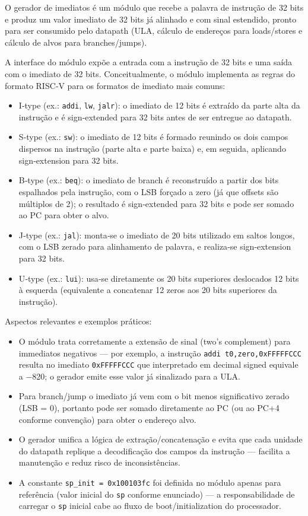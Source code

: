 \documentclass[12pt,a4paper]{article}
\begin{document}
O gerador de imediatos é um módulo que recebe a palavra de instrução de 32 bits e produz um valor imediato de 32 bits já alinhado e com sinal estendido, pronto para ser consumido pelo datapath (ULA, cálculo de endereços para loads/stores e cálculo de alvos para branches/jumps).

A interface do módulo expõe a entrada com a instrução de 32 bits e uma saída com o imediato de 32 bits. Conceitualmente, o módulo implementa as regras do formato RISC‑V para os formatos de imediato mais comuns:

\begin{itemize}
    \item I‑type (ex.: \texttt{addi}, \texttt{lw}, \texttt{jalr}): o imediato de 12 bits é extraído da parte alta da instrução e é sign‑extended para 32 bits antes de ser entregue ao datapath.
    \item S‑type (ex.: \texttt{sw}): o imediato de 12 bits é formado reunindo os dois campos dispersos na instrução (parte alta e parte baixa) e, em seguida, aplicando sign‑extension para 32 bits.
    \item B‑type (ex.: \texttt{beq}): o imediato de branch é reconstruído a partir dos bits espalhados pela instrução, com o LSB forçado a zero (já que offsets são múltiplos de 2); o resultado é sign‑extended para 32 bits e pode ser somado ao PC para obter o alvo.
    \item J‑type (ex.: \texttt{jal}): monta‑se o imediato de 20 bits utilizado em saltos longos, com o LSB zerado para alinhamento de palavra, e realiza‑se sign‑extension para 32 bits.
    \item U‑type (ex.: \texttt{lui}): usa‑se diretamente os 20 bits superiores deslocados 12 bits à esquerda (equivalente a concatenar 12 zeros aos 20 bits superiores da instrução).
\end{itemize}

Aspectos relevantes e exemplos práticos:
\begin{itemize}
    \item O módulo trata corretamente a extensão de sinal (two's complement) para immediatos negativos — por exemplo, a instrução \texttt{addi t0,zero,0xFFFFFCCC} resulta no imediato \texttt{0xFFFFFCCC} que interpretado em decimal signed equivale a −820; o gerador emite esse valor já sinalizado para a ULA.
    \item Para branch/jump o imediato já vem com o bit menos significativo zerado (LSB = 0), portanto pode ser somado diretamente ao PC (ou ao PC+4 conforme convenção) para obter o endereço alvo.
    \item O gerador unifica a lógica de extração/concatenação e evita que cada unidade do datapath replique a decodificação dos campos da instrução — facilita a manutenção e reduz risco de inconsistências.
    \item A constante \texttt{sp\_init = 0x100103fc} foi definida no módulo apenas para referência (valor inicial do \texttt{sp} conforme enunciado) — a responsabilidade de carregar o \texttt{sp} inicial cabe ao fluxo de boot/initialization do processador.
\end{itemize}
\end{document}
